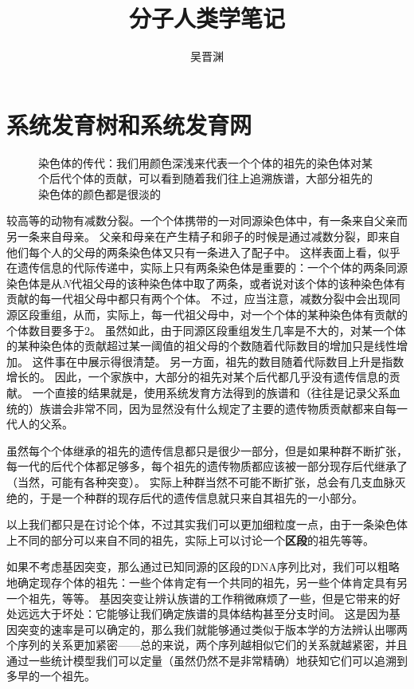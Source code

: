 \documentclass[hyperref, UTF8, a4paper, oneside]{ctexart}
\title{分子人类学笔记}
\author{吴晋渊}
\renewcommand{\emph}[1]{\textbf{#1}}
\numberwithin{equation}{section}
\begin{document}
\maketitle

\section{系统发育树和系统发育网}

\begin{figure}
    \centering
    
    \caption{染色体的传代：我们用颜色深浅来代表一个个体的祖先的染色体对某个后代个体的贡献，可以看到随着我们往上追溯族谱，大部分祖先的染色体的颜色都是很淡的}
    \label{fig:generation-passing}
\end{figure}

较高等的动物有减数分裂。一个个体携带的一对同源染色体中，有一条来自父亲而另一条来自母亲。
父亲和母亲在产生精子和卵子的时候是通过减数分裂，即来自他们每个人的父母的两条染色体又只有一条进入了配子中。
这样表面上看，似乎在遗传信息的代际传递中，实际上只有两条染色体是重要的：一个个体的两条同源染色体是从$N$代祖父母的该种染色体中取了两条，或者说对该个体的该种染色体有贡献的每一代祖父母中都只有两个个体。
不过，应当注意，减数分裂中会出现同源区段重组，从而，实际上，每一代祖父母中，对一个个体的某种染色体有贡献的个体数目要多于$2$。
虽然如此，由于同源区段重组发生几率是不大的，对某一个体的某种染色体的贡献超过某一阈值的祖父母的个数随着代际数目的增加只是线性增加。
这件事在中展示得很清楚。
另一方面，祖先的数目随着代际数目上升是指数增长的。
因此，一个家族中，大部分的祖先对某个后代都几乎没有遗传信息的贡献。
一个直接的结果就是，使用系统发育方法得到的族谱和（往往是记录父系血统的）族谱会非常不同，因为显然没有什么规定了主要的遗传物质贡献都来自每一代人的父系。

虽然每个个体继承的祖先的遗传信息都只是很少一部分，但是如果种群不断扩张，每一代的后代个体都足够多，每个祖先的遗传物质都应该被一部分现存后代继承了（当然，可能有各种突变）。
实际上种群当然不可能不断扩张，总会有几支血脉灭绝的，于是一个种群的现存后代的遗传信息就只来自其祖先的一小部分。

以上我们都只是在讨论个体，不过其实我们可以更加细粒度一点，由于一条染色体上不同的部分可以来自不同的祖先，实际上可以讨论一个\emph{区段}的祖先等等。

如果不考虑基因突变，那么通过已知同源的区段的DNA序列比对，我们可以粗略地确定现存个体的祖先：一些个体肯定有一个共同的祖先，另一些个体肯定具有另一个祖先，等等。
基因突变让辨认族谱的工作稍微麻烦了一些，但是它带来的好处远远大于坏处：它能够让我们确定族谱的具体结构甚至分支时间。
这是因为基因突变的速率是可以确定的，那么我们就能够通过类似于版本学的方法辨认出哪两个序列的关系更加紧密——总的来说，两个序列越相似它们的关系就越紧密，并且通过一些统计模型我们可以定量（虽然仍然不是非常精确）地获知它们可以追溯到多早的一个祖先。
\end{document}
